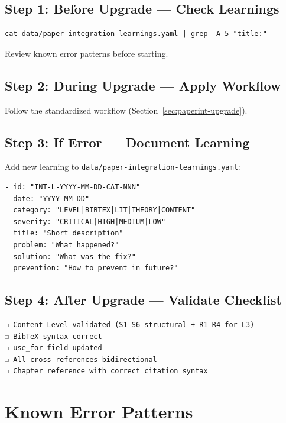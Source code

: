 \subsection{Step 1: Before Upgrade --- Check Learnings}

\begin{verbatim}
cat data/paper-integration-learnings.yaml | grep -A 5 "title:"
\end{verbatim}

Review known error patterns before starting.

\subsection{Step 2: During Upgrade --- Apply Workflow}

Follow the standardized workflow (Section~\ref{sec:paperint-upgrade}).

\subsection{Step 3: If Error --- Document Learning}

Add new learning to \texttt{data/paper-integration-learnings.yaml}:

\begin{verbatim}
- id: "INT-L-YYYY-MM-DD-CAT-NNN"
  date: "YYYY-MM-DD"
  category: "LEVEL|BIBTEX|LIT|THEORY|CONTENT"
  severity: "CRITICAL|HIGH|MEDIUM|LOW"
  title: "Short description"
  problem: "What happened?"
  solution: "What was the fix?"
  prevention: "How to prevent in future?"
\end{verbatim}

\subsection{Step 4: After Upgrade --- Validate Checklist}

\begin{verbatim}
☐ Content Level validated (S1-S6 structural + R1-R4 for L3)
☐ BibTeX syntax correct
☐ use_for field updated
☐ All cross-references bidirectional
☐ Chapter reference with correct citation syntax
\end{verbatim}


\section{Known Error Patterns}
\label{sec:paperint-errors}

